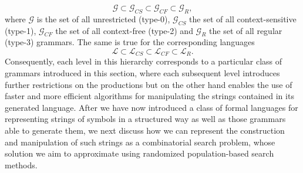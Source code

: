 \begin{equation*}
	\mathcal{G} \subset \mathcal{G}_{CS} \subset \mathcal{G}_{CF} \subset \mathcal{G}_{R}, 
\end{equation*} 
where $\mathcal{G}$ is the set of all unrestricted (type-0), $\mathcal{G}_{CS}$ the set of all context-sensitive (type-1), $\mathcal{G}_{CF}$ the set of all context-free (type-2) and $\mathcal{G}_{R}$ the set of all regular (type-3) grammars.
The same is true for the corresponding languages
\begin{equation*}
	\mathcal{L} \subset \mathcal{L}_{CS} \subset \mathcal{L}_{CF} \subset \mathcal{L}_{R}. 
\end{equation*}
Consequently, each level in this hierarchy corresponds to a particular class of grammars introduced in this section, where each subsequent level introduces further restrictions on the productions but on the other hand enables the use of faster and more efficient algorithms for manipulating the strings contained in its generated language.
After we have now introduced a class of formal languages for representing strings of symbols in a structured way as well as those grammars able to generate them, we next discuss how we can represent the construction and manipulation of such strings as a combinatorial search problem, whose solution we aim to approximate using randomized population-based search methods.







   

